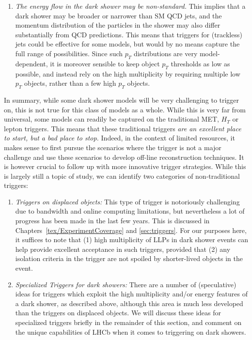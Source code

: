 \begin{enumerate}
\item \emph{The energy flow in the dark shower may be non-standard.} This implies that a dark shower may be broader or narrower than SM QCD jets, and the momentum distribution of the particles in the shower may also differ substantially from QCD predictions. This means that triggers for (trackless) jets could be effective for some models, but would by no means capture the full range of possibilities. Since such $p_T$ distributions are very model-dependent, it is moreover sensible to keep object $p_T$ thresholds as low as possible, and instead rely on the high multiplicity by requiring multiple low $p_T$ objects, rather than a few high $p_T$ objects.
\end{enumerate}

In summary, while some dark shower models will be very challenging to trigger on, this is not true for this class of models as a whole. While this is very far from universal, some models can readily be captured on the traditional MET, $H_T$ or lepton triggers. This means that these traditional triggers \emph{are an excellent place to start, but a bad place to stop.} Indeed, in the context of limited resources, it makes sense to first pursue the scenarios where the trigger is not a major challenge and use these scenarios to develop off-line reconstruction techniques. It is however crucial to follow up with more innovative trigger strategies. While this is largely still a topic of study, we can identify two categories of non-traditional triggers:
\begin{enumerate}
\item \emph{Triggers on displaced objects:} This type of trigger is notoriously challenging due to bandwidth and online computing limitations, but nevertheless a lot of progress has been made in the last few years. This is discussed in Chapters~\ref{tex/ExperimentCoverage} and \ref{sec:triggers}.  For our purposes here, it suffices to note that (1) high multiplicity of LLPs in dark shower events can help provide excellent acceptance in such triggers, provided that (2) any isolation criteria in the trigger are not spoiled by shorter-lived objects in the event.

\item \emph{Specialized Triggers for dark showers:} There are a number of (speculative) ideas for triggers which exploit the high multiplicity and/or energy features of a dark shower, as described above, although this area is much less developed than the triggers on displaced objects. We will discuss these ideas for specialized triggers briefly in the remainder of this section, and comment on the unique capabilities of LHCb when it comes to triggering on dark showers.


\end{enumerate}



